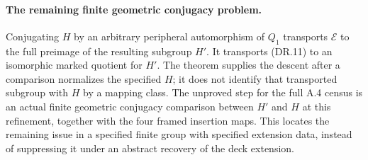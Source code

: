 \paragraph{The remaining finite geometric conjugacy problem.}
Conjugating $H$ by an arbitrary peripheral
automorphism of $Q_1$ transports $\mathcal E$ to
the full preimage of the resulting subgroup $H'$.
It transports (DR.11) to an isomorphic marked
quotient for $H'$.
The theorem supplies the descent after a comparison
normalizes the specified $H$; it does not identify
that transported subgroup with $H$ by a mapping
class.  The unproved step for the full A.4 census
is an actual finite geometric conjugacy comparison
between $H'$ and $H$ at this refinement, together
with the four framed insertion maps.
This locates the remaining issue in a specified
finite group with specified extension data, instead
of suppressing it under an abstract recovery of
the deck extension.

